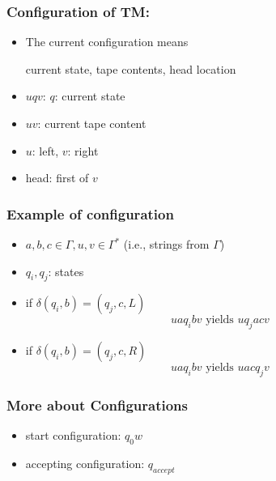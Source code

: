 




\begin{frame}[allowframebreaks] \frametitle{Configuration of TM:}
  \begin{itemize}
  \item The current configuration means
    \begin{center}
    current state, tape contents, head location
\end{center}
\item $uqv$: $q$: current state

\item [] $uv$: current tape content

\item [] $u$: left, $v$: right

\item [] head: first of $v$

\end{itemize}\end{frame} \begin{frame}[allowframebreaks] \frametitle{Example of configuration}
  \begin{itemize}
\item $a,b,c \in \Gamma, u,v \in \Gamma^*$ (i.e., strings from
$\Gamma$)

\item [] $q_i, q_j$: states

\item if $\delta(q_i,b) =(q_j, c, L)$
  \begin{equation*}
uaq_i bv \mbox{ yields } uq_j a cv
  \end{equation*}
\item if $\delta(q_i,b) = (q_j, c, R)$
  \begin{equation*}
    uaq_i bv \mbox{ yields } uacq_j v
  \end{equation*}
\end{itemize}\end{frame} \begin{frame}[allowframebreaks] \frametitle{More about Configurations}
  \begin{itemize}
\item start configuration: $q_0 w$
\item accepting configuration: $q_{accept}$


\end{itemize}
\end{frame}
